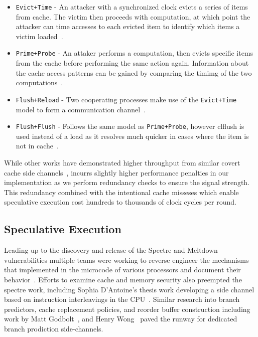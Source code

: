 \begin{itemize}
\item \texttt{Evict+Time} - An attacker with a synchronized clock evicts a series of items 
from cache. The victim then proceeds with computation, at which point the attacker can 
time accesses to each evicted item to identify which items a victim loaded~\cite{neve2006refined}. 
\item \texttt{Prime+Probe} - An attaker performs a computation, then evicts specific 
items from the cache before performing the same action again. Information about the cache
access patterns can be gained by comparing the timimg of the two 
computations~\cite{tromer2010efficient}.
\item \texttt{Flush+Reload} - Two cooperating processes  make use of the \texttt{Evict+Time} 
model to form a communication channel~\cite{yarom2014flush+}.
\item \texttt{Flush+Flush} - Follows the same model as \texttt{Prime+Probe},
however clflush is used instead of a load as it resolves much quicker in cases 
where the item is not in cache~\cite{gruss2016flush+flush}.
\end{itemize}

While other works have demonstrated higher throughput from similar 
covert cache side channels~\cite{liu2015last}, \speculake incurrs slightly higher performance 
penalties in our implementation as we perform redundancy checks to 
ensure the signal strength.  This redundancy combined with the intentional cache misseses
which enable speculative execution cost hundreds to thousands of clock cycles
per round. 


\subsection{Speculative Execution}

Leading up to the discovery and release of the Spectre and Meltdown vulnerabilities
multiple teams were working to reverse engineer the mechanisms that implemented in 
the microcode of various processors and document their behavior~\cite{intel-instruction-tables, uop_article}.
Efforts to examine cache and memory security also preempted the spectre work, 
including Sophia D'Antoine's thesis work developing a side channel based on 
instruction interleavings in the CPU~\cite{d2015exploiting}. Similar research into branch 
predictors, cache replacement policies, and reorder buffer construction including work by Matt 
Godbolt~\cite{godbolt2016branch}, and Henry Wong~\cite{measuring-rob} paved the runway for 
dedicated branch prodiction side-channels.

